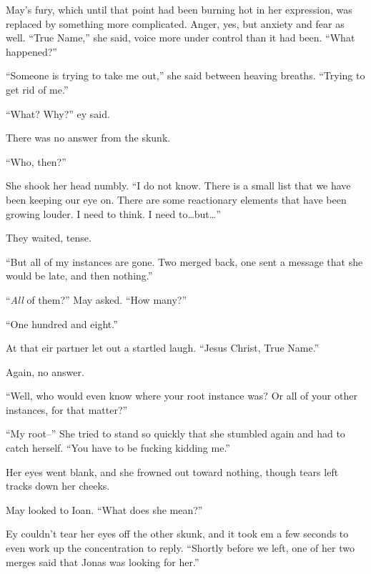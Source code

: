 May's fury, which until that point had been burning hot in her expression, was replaced by something more complicated. Anger, yes, but anxiety and fear as well. ``True Name,'' she said, voice more under control than it had been. ``What happened?''

``Someone is trying to take me out,'' she said between heaving breaths. ``Trying to get rid of me.''

``What? Why?'' ey said.

There was no answer from the skunk.

``Who, then?''

She shook her head numbly. ``I do not know. There is a small list that we have been keeping our eye on. There are some reactionary elements that have been growing louder. I need to think. I need to\ldots but\ldots{}''

They waited, tense.

``But all of my instances are gone. Two merged back, one sent a message that she would be late, and then nothing.''

``\emph{All} of them?'' May asked. ``How many?''

``One hundred and eight.''

At that eir partner let out a startled laugh. ``Jesus Christ, True Name.''

Again, no answer.

``Well, who would even know where your root instance was? Or all of your other instances, for that matter?''

``My root--'' She tried to stand so quickly that she stumbled again and had to catch herself. ``You have to be fucking kidding me.''

Her eyes went blank, and she frowned out toward nothing, though tears left tracks down her cheeks.

May looked to Ioan. ``What does she mean?''

Ey couldn't tear her eyes off the other skunk, and it took em a few seconds to even work up the concentration to reply. ``Shortly before we left, one of her two merges said that Jonas was looking for her.''
